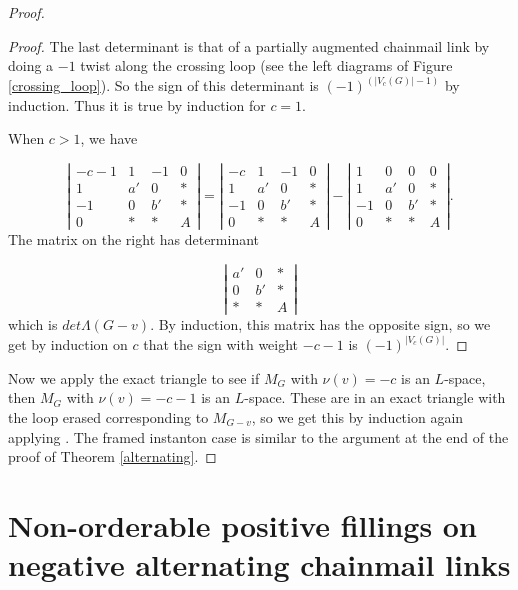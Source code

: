 \documentclass{amsart}
\theoremstyle{definition}
\theoremstyle{remark}
\begin{document}
\begin{proof}
\begin{proof}
The last determinant is that of a partially augmented chainmail link by doing a $-1$ twist along the crossing loop (see the left diagrams of Figure \ref{crossing_loop}). So the sign of this determinant is $(-1)^{(|V_c(G)|-1)}$ by induction. Thus it is true by induction for $c=1$. 

When $c>1$, we have 

$$\left|\begin{array}{cccc}-c-1 & 1 & -1 & 0 \\1 & a' & 0 & \ast \\-1 & 0 & b' & \ast \\0 & \ast & \ast & A\end{array}\right| =\left|\begin{array}{cccc}-c & 1 & -1 & 0 \\1 & a' & 0 & \ast \\-1 & 0 & b' & \ast \\0 & \ast & \ast & A\end{array}\right| - \left|\begin{array}{cccc}1&0 & 0 & 0 \\1 & a' & 0 & \ast \\-1 & 0 & b' & \ast \\0 & \ast & \ast & A\end{array}\right| .$$
The matrix on the right has determinant 

$$\left|\begin{array}{ccc}  a' & 0 & \ast \\ 0 & b' & \ast \\ \ast & \ast & A\end{array}\right|$$
which is $det \Lambda(G-v)$. By induction, this matrix has the opposite sign, so we get by induction on $c$ that the sign with weight $-c-1$ is $(-1)^{|V_c(G)|}$. 
\end{proof}

Now we apply the exact triangle to see if $M_G$ with $\nu(v)=-c$ is an $L$-space, then $M_G$ with $\nu(v)=-c-1$ is an $L$-space. These are in an exact triangle with the loop erased corresponding to $M_{G-v}$, so we get this by induction again applying \cite[Proposition 2.1]{MR2168576}. The framed instanton case is similar to the argument at the end of the proof of Theorem \ref{alternating}.
\end{proof}


\section{Non-orderable positive fillings on negative alternating chainmail links}
\end{document}
